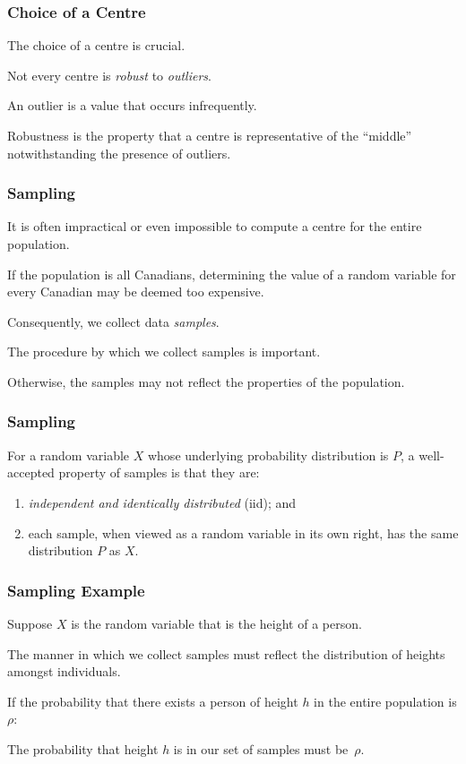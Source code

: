 \begin{frame}
\frametitle{Choice of a Centre}
\begin{changemargin}{1cm}

The choice of a centre is crucial. 

Not every centre is
\emph{robust} to \emph{outliers}. 

An outlier is a value
that occurs infrequently. 

Robustness is the property that
a centre is representative of the ``middle'' notwithstanding
the presence of outliers. 

\end{changemargin}
\end{frame}


\begin{frame}
\frametitle{Sampling}
\begin{changemargin}{1cm}
It is often impractical or even impossible to compute a
centre for the entire population. 

If the population
is all Canadians, determining the value of a random variable
for every Canadian may be deemed too expensive.

Consequently, we collect data \emph{samples}.

The procedure by which we collect samples is important.

Otherwise,
the samples may not reflect the properties of the population.

\end{changemargin}
\end{frame}


\begin{frame}
\frametitle{Sampling}
\begin{changemargin}{1cm}

For a random variable $X$ whose underlying
probability distribution is $P$, a well-accepted property of
samples is that they are: 
\begin{enumerate}
\item \emph{independent and identically
distributed} (iid); and
\item each sample, when viewed as a
random variable
in its own right, has the same distribution $P$ as $X$.
\end{enumerate}

\end{changemargin}
\end{frame}


\begin{frame}
\frametitle{Sampling Example}
\begin{changemargin}{1cm}

Suppose $X$ is the random variable that is the height
of a person. 


The manner in which we collect samples must
reflect the distribution of heights amongst individuals.

If the probability that there exists a person of height $h$ in
the entire population is $\rho$: 

The probability that height
$h$ is in our set of samples must be~$\rho$.

\end{changemargin}
\end{frame}

